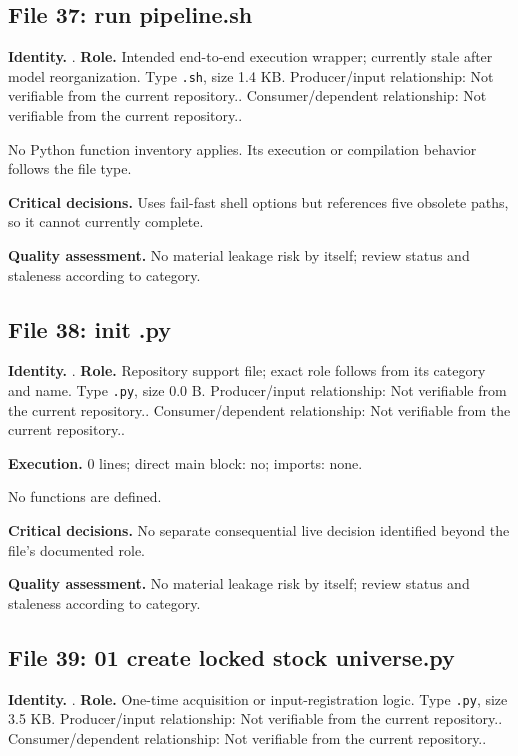 \documentclass[
  11pt,
  a4paper]{article}
\newcounter{none} %
\begin{document}
\subsection{File 37: run pipeline.sh}\label{file-8130338279923343840}

\textbf{Identity.} . \textbf{Role.} Intended
end-to-end execution wrapper; currently stale after model
reorganization. Type \texttt{.sh}, size 1.4 KB. Producer/input
relationship: Not verifiable from the current repository..
Consumer/dependent relationship: Not verifiable from the current
repository..

No Python function inventory applies. Its execution or compilation
behavior follows the file type.

\textbf{Critical decisions.} Uses fail-fast shell options but references
five obsolete paths, so it cannot currently complete.

\textbf{Quality assessment.} No material leakage risk by itself; review
status and staleness according to category.

\subsection{File 38: init .py}\label{file-4614720323331988025}

\textbf{Identity.} . \textbf{Role.} Repository
support file; exact role follows from its category and name. Type
\texttt{.py}, size 0.0 B. Producer/input relationship: Not verifiable
from the current repository.. Consumer/dependent relationship: Not
verifiable from the current repository..

\textbf{Execution.} 0 lines; direct main block: no; imports: none.

No functions are defined.

\textbf{Critical decisions.} No separate consequential live decision
identified beyond the file's documented role.

\textbf{Quality assessment.} No material leakage risk by itself; review
status and staleness according to category.

\subsection{File 39: 01 create locked stock
universe.py}\label{file-8595166770765759599}

\textbf{Identity.}
.
\textbf{Role.} One-time acquisition or input-registration logic. Type
\texttt{.py}, size 3.5 KB. Producer/input relationship: Not verifiable
from the current repository.. Consumer/dependent relationship: Not
verifiable from the current repository..
\end{document}
